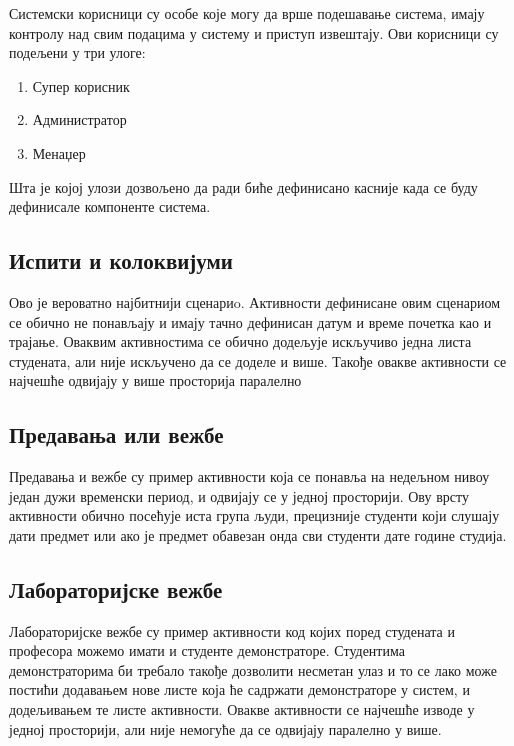 \documentclass[a4paper, 12pt, diplomski]{etfcyr}
\makeatletter
\newcommand{\indentfirstparagraphon}{
	\renewenvironment{justify}{%
		\trivlist
		\justifying
		\itemindent\JustifyingParindent
	\item\relax
	}{
		\endtrivlist
	}
}
\gdef\tshortstack{\@ifnextchar[\@tshortstack{\@tshortstack[c]}}
\let\@tshortstack\@shortstack
\makeatother
\begin{document}
\begin{labeling}{\smash{\tshortstack[l]{Корисник\\лабораторије}}}
					\item[\smash{\tshortstack[l]{Системски\\корисник}}]
						\begin{justify}
							Системски корисници су особе које могу да врше подешавање система, имају контролу над свим подацима у систему и приступ извештају. Ови корисници су подељени у три улоге:
							\begin{enumerate}[noitemsep]
								\item Супер корисник
								\item Администратор
								\item Менаџер
							\end{enumerate}
							Шта је којој улози дозвољено да ради биће дефинисано касније када се буду дефинисале компоненте система.
						\end{justify}
					\indentfirstparagraphon
				\end{labeling}

			\subsection[Сценарио 1]{Испити и колоквијуми}
				\begin{justify}
				Ово је вероватно најбитнији сценариo. Активности дефинисане овим сценариом се обично не понављају и имају тачно дефинисан датум и време почетка као и трајање. Оваквим активностима се обично додељује искључиво једна листа студената, али није искључено да се доделе и више. Такође овакве активности се најчешће одвијају у више просторија паралелно
				\end{justify}

			\subsection[Сценарио 2]{Предавања или вежбе}
				\begin{justify}
					Предавања и вежбе су пример активности која се понавља на недељном нивоу један дужи временски период, и одвијају се у једној просторији. Ову врсту активности обично посећује иста група људи, прецизније студенти који слушају дати предмет или ако је предмет обавезан онда сви студенти дате године студија.
				\end{justify}

			\subsection[Сценарио 3]{Лабораторијске вежбе}
				\begin{justify}
					Лабораторијске вежбе су пример активности код којих поред студената и професора можемо имати и студенте демонстраторе. Студентима демонстраторима би требало такође дозволити несметан улаз и то се лако може постићи додавањем нове листе која ће садржати демонстраторе у систем, и додељивањем те листе активности. Овакве активности се најчешће изводе у једној просторији, али није немогуће да се одвијају паралелно у више.
				\end{justify}
\end{document}
